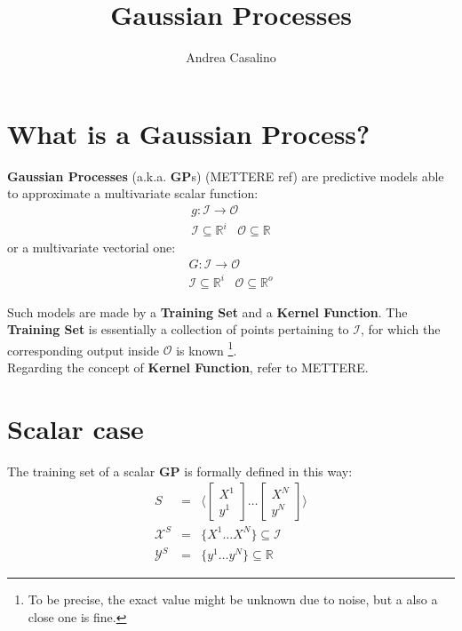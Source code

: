 \documentclass{article}
\author{Andrea Casalino}
\title{Gaussian Processes}
\begin{document}
\maketitle

\newpage
\section{What is a Gaussian Process?}

\textbf{Gaussian Processes} (a.k.a. \textbf{GP}s) (METTERE ref) are predictive models able to approximate a multivariate scalar function:
\begin{eqnarray}
g : \mathcal{I} \rightarrow \mathcal{O} \\
\mathcal{I} \subseteq \mathbb{R}^i \,\,\,\,\, \mathcal{O} \subseteq \mathbb{R}
\end{eqnarray}
or a  multivariate vectorial one:
\begin{eqnarray}
G : \mathcal{I} \rightarrow \mathcal{O} \\
\mathcal{I} \subseteq \mathbb{R}^i \,\,\,\,\, \mathcal{O} \subseteq \mathbb{R}^o 
\end{eqnarray}

Such models are made by a \textbf{Training Set} and a \textbf{Kernel Function}.
The \textbf{Training Set} is essentially a collection of points pertaining to $\mathcal{I}$, for which the corresponding output inside $\mathcal{O}$ is known \footnote{To be precise, the exact value might be unknown due to noise, but a also a close one is fine.}.
\\
Regarding the concept of \textbf{Kernel Function}, refer to METTERE.

\section{Scalar case}

The training set of a scalar \textbf{GP} is formally defined in this way:
\begin{eqnarray}
S &=& 
\bigg \langle 
\begin{bmatrix} X^1 \\ y^1 \end{bmatrix}
\hdots
\begin{bmatrix} X^N \\ y^N \end{bmatrix} 
\bigg \rangle \\
\mathcal{X}^S &=& \big \lbrace X^1 \hdots X^N \big \rbrace \subseteq \mathcal{I} \\
\mathcal{Y}^S &=& \big \lbrace y^1 \hdots y^N \big \rbrace \subseteq \mathbb{R}
\end{eqnarray}
\end{document}
